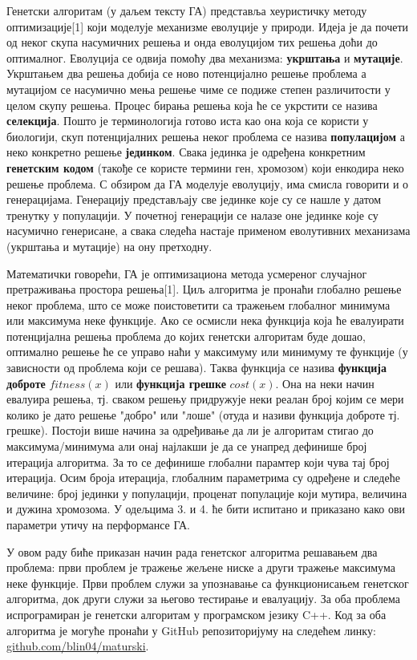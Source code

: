 \documentclass{article}
\begin{document}
Генетски алгоритам (у даљем тексту ГА) представља хеуристичку методу оптимизације[1] који моделује
механизме еволуције у природи. Идеја је да почети од неког скупа насумичних решења и онда
еволуцијом тих решења доћи до оптималног. Еволуција се одвија помоћу два механизма: \textbf{укрштања}
и \textbf{мутације}. Укрштањем два решења добија се ново потенцијално решење проблема а мутацијом се насумично мења решење чиме
се подиже степен различитости у целом скупу решења. Процес бирања решења која ће се укрстити се назива 
\textbf{селекција}. Пошто је терминологија готово иста као она која се користи у биологији, скуп потенцијалних 
решења неког проблема се назива \textbf{популацијом} а неко конкретно решење \textbf{јединком}. 
Свака јединка је одређена конкретним \textbf{генетским кодом} (такође се користе термини ген, хромозом) који енкодира неко
решење проблема. С обзиром да  ГА моделује еволуцију, има смисла говорити и о генерацијама. Генерацију 
представљају све јединке које су се нашле у датом тренутку у популацији. У почетној генерацији се 
налазе оне јединке које су насумично генерисане, а свака следећа настаје применом еволутивних 
механизама (укрштања и мутације) на ону претходну. 

Математички говорећи, ГА је оптимизациона метода усмереног случајног претраживања
простора решења[1]. Циљ алгоритма је пронаћи глобално решење неког проблема, што се 
може поистоветити са тражењем глобалног минимума или максимума неке функције. Ако
се осмисли нека функција која ће евалуирати потенцијална решења проблема до којих 
генетски алгоритам буде дошао, оптимално решење ће се управо наћи у максимуму или
минимуму те функције (у зависности од проблема који се решава). Таква функција се назива \textbf{функција доброте}
$fitness(x)$ или \textbf{функција грешке} $cost(x)$. Она на неки начин евалуира решења, 
тј. сваком решењу придружује неки реалан број којим се мери колико је дато решење "добро" или "лоше"
(отуда и називи функција доброте тј. грешке). Постоји више начина за одређивање да ли је алгоритам стигао до максимума/минимума али 
онај најлакши је да се унапред дефинише број итерација алгоритма. За то
се дефинише глобални парамтер који чува тај број итерација. Осим броја итерација, глобалним 
параметрима су одређене и следеће величине: број јединки у популацији, проценат популације који мутира, величина и дужина хромозома. 
У одељцима 3. и 4. ће бити испитано и приказано како ови параметри утичу на перформансе ГА.

У овом раду биће приказан начин рада генетског алгоритма решавањем два проблема: први проблем
је тражење жељене ниске а други тражење максимума неке функције. Први проблем служи за 
упознавање са функционисањем генетског алгоритма, док други служи за његово тестирање и 
евалуацију. За оба проблема испрограмиран је генетски алгоритам у програмском језику 
C++. Код за оба алгоритма је могуће пронаћи у GitHub репозиторијуму на следећем
линку: \url{github.com/blin04/maturski}.
\end{document}
